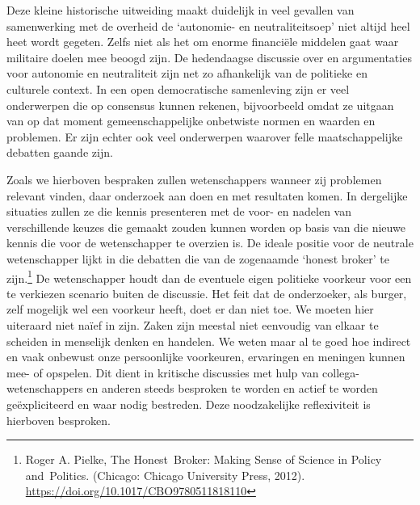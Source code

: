 \documentclass[empirical, authordate, ]{new-jote-article}
\begin{document}
	Deze kleine historische uitweiding maakt duidelijk in veel gevallen van samenwerking met de overheid de ‘autonomie- en neutraliteitsoep' niet altijd heel heet wordt gegeten. Zelfs niet als het om enorme financiële middelen gaat waar militaire doelen mee beoogd zijn. De hedendaagse discussie over en argumentaties voor autonomie en neutraliteit zijn net zo afhankelijk van de politieke en culturele context. In een open democratische samenleving zijn er veel onderwerpen die op consensus kunnen rekenen, bijvoorbeeld omdat ze uitgaan van op dat moment gemeenschappelijke onbetwiste normen en waarden en problemen. Er zijn echter ook veel onderwerpen waarover felle maatschappelijke debatten gaande zijn.



	Zoals we hierboven bespraken zullen wetenschappers wanneer zij problemen relevant vinden, daar onderzoek aan doen en met resultaten komen. In dergelijke situaties zullen ze die kennis presenteren met de voor- en nadelen van verschillende keuzes die gemaakt zouden kunnen worden op basis van die nieuwe kennis die voor de wetenschapper te overzien is. De ideale positie voor de neutrale wetenschapper lijkt in die debatten die van de zogenaamde ‘honest broker' te zijn.\footnote{Roger A. Pielke, The Honest Broker: Making Sense of Science in Policy and Politics. (Chicago: Chicago University Press, 2012). \href{about:blank}{https://doi.org/10.1017/CBO9780511818110}} De wetenschapper houdt dan de eventuele eigen politieke voorkeur voor een te verkiezen scenario buiten de discussie. Het feit dat de onderzoeker, als burger, zelf mogelijk wel een voorkeur heeft, doet er dan niet toe. We moeten hier uiteraard niet naïef in zijn. Zaken zijn meestal niet eenvoudig van elkaar te scheiden in menselijk denken en handelen. We weten maar al te goed hoe indirect en vaak onbewust onze persoonlijke voorkeuren, ervaringen en meningen kunnen mee- of opspelen. Dit dient in kritische discussies met hulp van collega-wetenschappers en anderen steeds besproken te worden en actief te worden geëxpliciteerd en waar nodig bestreden. Deze noodzakelijke reflexiviteit is hierboven besproken.
\end{document}
